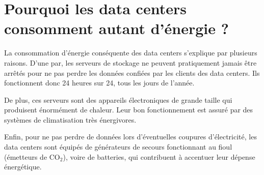 \section{Pourquoi les data centers consomment autant d'énergie ?}
\begin{onehalfspace}
La consommation d’énergie conséquente des data centers s’explique par plusieurs raisons. D'une par, les serveurs de stockage ne peuvent pratiquement jamais être arrêtés pour ne pas perdre les données confiées par les clients des data centers. Ils fonctionnent donc 24 heures sur 24, tous les jours de l'année.
\medskip 

De plus, ces serveurs sont des appareils électroniques de grande taille qui produisent énormément de chaleur. Leur bon fonctionnement est assuré par des systèmes de climatisation très énergivores.\medskip 

Enfin, pour ne pas perdre de données lors d'éventuelles coupures d'électricité, les data centers sont équipés de générateurs de secours fonctionnant au fioul (émetteurs de CO$_{2}$), voire de batteries, qui contribuent à accentuer leur dépense énergétique.
\end{onehalfspace}
